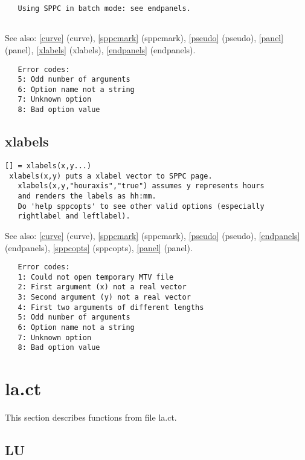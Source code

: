 \documentclass[a4paper]{article}
\begin{document}
\begin{tscreen}
\begin{verbatim}
   Using SPPC in batch mode: see endpanels.
  
\end{verbatim}

See also: \ref{curve} {(curve)}, \ref{sppcmark} {(sppcmark)}, \ref{pseudo} {(pseudo)}, \ref{panel} {(panel)}, \ref{xlabels} {(xlabels)}, \ref{endpanels} {(endpanels)}.
\begin{verbatim}
   Error codes:
   5: Odd number of arguments
   6: Option name not a string
   7: Unknown option
   8: Bad option value
\end{verbatim}
\end{tscreen}



\subsection{xlabels\label{xlabels}}

\begin{tscreen}
\begin{verbatim}
[] = xlabels(x,y...)
 xlabels(x,y) puts a xlabel vector to SPPC page.
   xlabels(x,y,"houraxis","true") assumes y represents hours
   and renders the labels as hh:mm.
   Do 'help sppcopts' to see other valid options (especially
   rightlabel and leftlabel).
\end{verbatim}

See also: \ref{curve} {(curve)}, \ref{sppcmark} {(sppcmark)}, \ref{pseudo} {(pseudo)}, \ref{endpanels} {(endpanels)}, \ref{sppcopts} {(sppcopts)}, \ref{panel} {(panel)}.
\begin{verbatim}
   Error codes:
   1: Could not open temporary MTV file
   2: First argument (x) not a real vector
   3: Second argument (y) not a real vector
   4: First two arguments of different lengths
   5: Odd number of arguments
   6: Option name not a string
   7: Unknown option
   8: Bad option value
\end{verbatim}
\end{tscreen}





\section{la.ct}

This section describes functions from file la.ct.




\subsection{LU\label{LU}}
\end{document}
